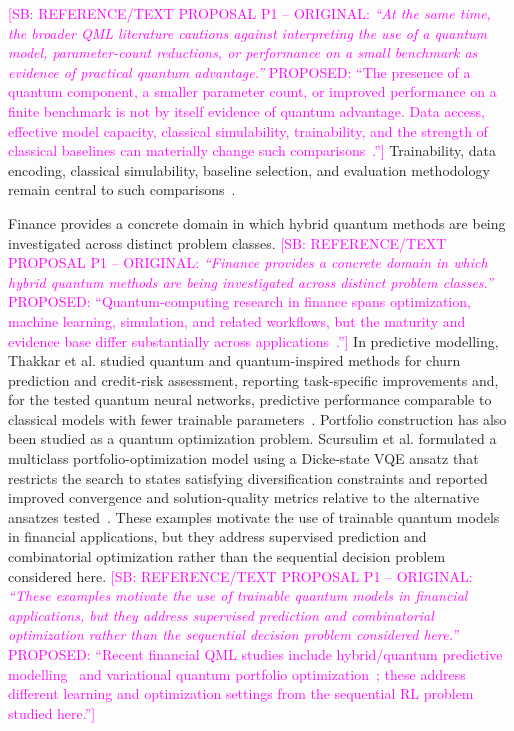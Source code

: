 \documentclass[aps,floatfix,superscriptaddress,twocolumn,tightenlines,amsmath,amssymb,nofootinbib,10pt,longbibliography,prl]{revtex4-2}
\newcommand{\sam}[1]{\textcolor{magenta}{[SB: {#1}]}}
\begin{document}
\sam{REFERENCE/TEXT PROPOSAL P1 -- ORIGINAL: \textit{``At the same time, the broader QML literature cautions against interpreting the use of a quantum model, parameter-count reductions, or performance on a small benchmark as evidence of practical quantum advantage.''} PROPOSED: ``The presence of a quantum component, a smaller parameter count, or improved performance on a finite benchmark is not by itself evidence of quantum advantage. Data access, effective model capacity, classical simulability, trainability, and the strength of classical baselines can materially change such comparisons~\cite{Huang2021Powerofdatainquant,Haug2021CapacityQuantumGeometry,Tang2022Dequantizingalgori,Shin2024Dequantizingquantu,GilFuster2024Understandingquant}.''} Trainability, data encoding, classical simulability, baseline selection, and evaluation methodology remain central to such comparisons~\cite{Schuld2021Effectofdataencodi,Huang2021Powerofdatainquant,Tang2022Dequantizingalgori,McClean2018Barrenplateausinqu}.

Finance provides a concrete domain in which hybrid quantum methods are being investigated across distinct problem classes.
\sam{REFERENCE/TEXT PROPOSAL P1 -- ORIGINAL: \textit{``Finance provides a concrete domain in which hybrid quantum methods are being investigated across distinct problem classes.''} PROPOSED: ``Quantum-computing research in finance spans optimization, machine learning, simulation, and related workflows, but the maturity and evidence base differ substantially across applications~\cite{Orus2019QuantumFinance,Herman2023QuantumFinance}.''} In predictive modelling, Thakkar et al. studied quantum and quantum-inspired methods for churn prediction and credit-risk assessment, reporting task-specific improvements and, for the tested quantum neural networks, predictive performance comparable to classical models with fewer trainable parameters~\cite{Thakkar2024FinancialForecasting}. Portfolio construction has also been studied as a quantum optimization problem. Scursulim et al. formulated a multiclass portfolio-optimization model using a Dicke-state VQE ansatz that restricts the search to states satisfying diversification constraints and reported improved convergence and solution-quality metrics relative to the alternative ansatzes tested~\cite{Scursulim2026MulticlassPortfolio}. These examples motivate the use of trainable quantum models in financial applications, but they address supervised prediction and combinatorial optimization rather than the sequential decision problem considered here.
\sam{REFERENCE/TEXT PROPOSAL P1 -- ORIGINAL: \textit{``These examples motivate the use of trainable quantum models in financial applications, but they address supervised prediction and combinatorial optimization rather than the sequential decision problem considered here.''} PROPOSED: ``Recent financial QML studies include hybrid/quantum predictive modelling~\cite{Thakkar2024FinancialForecasting} and variational quantum portfolio optimization~\cite{Scursulim2026MulticlassPortfolio}; these address different learning and optimization settings from the sequential RL problem studied here.''}
\end{document}
